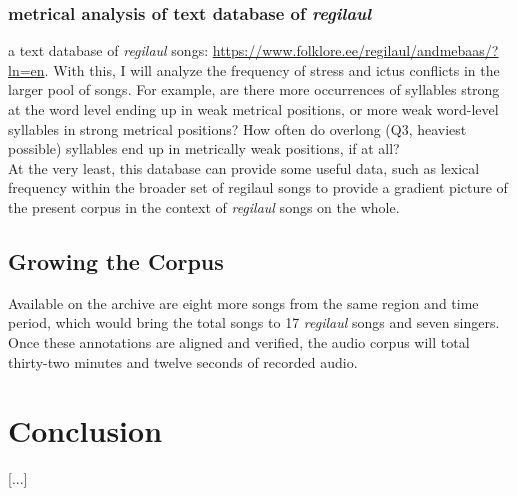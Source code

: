 \documentclass[11pt]{article}
\begin{document}
\subsubsection*{metrical analysis of text database of {\it regilaul}}
 a text database of {\it regilaul} songs: \url{https://www.folklore.ee/regilaul/andmebaas/?ln=en}. With this, I will analyze the frequency of stress and ictus conflicts in the larger pool of songs.  For example, are there more occurrences of syllables strong at the word level ending up in weak metrical positions, or more weak word-level syllables in strong metrical positions? How often do overlong (Q3, heaviest possible) syllables end up in metrically weak positions, if at all? \\
At the very least, this database can provide some useful data, such as lexical frequency within the broader set of regilaul songs to provide a gradient picture of the present corpus in the context of {\it regilaul} songs on the whole. 

\subsection{Growing the Corpus} 
Available on the archive are eight more songs from the same region and time period, which would bring the total songs to 17 {\it regilaul} songs and seven singers. Once these annotations are aligned and verified, the audio corpus will total thirty-two minutes and twelve seconds of recorded audio. 

\section*{Conclusion}

[...]



%


\end{document}
